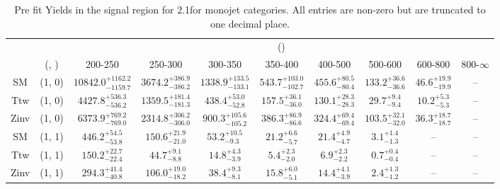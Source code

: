 \begin{table}[h!]
\tiny
\centering
\caption{Pre fit Yields in the signal region for 2.1\ifb for monojet categories. All entries are non-zero but are truncated to one decimal place.\label{tab:prednodatanaive_sig_comb_mono}}
\begin{tabular}
{cccccccccc}
	\hline\hline
	&	& \multicolumn{8}{c}{\scalht (\gev)}\\ 
	&	 (\njet, \nb) & 200-250 & 250-300 & 300-350 & 350-400 & 400-500 & 500-600 & 600-800 & 800-$\infty$ \\ [0.8ex] 
\hline
	SM & (1, 0) & $10842.0^{+ 1162.2 }_{- 1159.7 }$ & $3674.2^{+ 386.9 }_{- 386.2 }$ & $1338.9^{+ 133.5 }_{- 133.1 }$ & $543.7^{+ 103.0 }_{- 102.7 }$ & $455.6^{+ 80.5 }_{- 80.4 }$ & $133.2^{+ 36.6 }_{- 36.6 }$ & $46.6^{+ 19.9 }_{- 19.9 }$ & -- \\[0.5ex] 
	Ttw & (1, 0) & $4427.8^{+ 536.3 }_{- 536.2 }$ & $1359.5^{+ 181.4 }_{- 181.3 }$ & $438.4^{+ 53.0 }_{- 52.8 }$ & $157.5^{+ 36.1 }_{- 36.0 }$ & $130.1^{+ 28.3 }_{- 28.3 }$ & $29.7^{+ 9.4 }_{- 9.4 }$ & $10.2^{+ 5.3 }_{- 5.3 }$ & -- \\[0.5ex] 
	Zinv & (1, 0) & $6373.9^{+ 769.2 }_{- 769.0 }$ & $2314.8^{+ 306.2 }_{- 306.0 }$ & $900.3^{+ 105.6 }_{- 105.2 }$ & $386.3^{+ 86.9 }_{- 86.6 }$ & $324.4^{+ 69.4 }_{- 69.4 }$ & $103.5^{+ 32.1 }_{- 32.0 }$ & $36.3^{+ 18.7 }_{- 18.7 }$ & -- \\[0.5ex] 
	SM & (1, 1) & $446.2^{+ 54.5 }_{- 53.8 }$ & $150.6^{+ 21.9 }_{- 21.0 }$ & $53.2^{+ 10.5 }_{- 9.3 }$ & $21.2^{+ 6.6 }_{- 5.7 }$ & $21.4^{+ 4.9 }_{- 4.7 }$ & $3.1^{+ 1.4 }_{- 1.3 }$ & -- & -- \\[0.5ex] 
	Ttw & (1, 1) & $150.2^{+ 22.7 }_{- 22.4 }$ & $44.7^{+ 9.1 }_{- 8.8 }$ & $14.8^{+ 4.3 }_{- 3.9 }$ & $5.4^{+ 2.3 }_{- 2.0 }$ & $6.9^{+ 2.3 }_{- 2.2 }$ & $0.7^{+ 0.4 }_{- 0.4 }$ & -- & -- \\[0.5ex] 
	Zinv & (1, 1) & $294.3^{+ 41.4 }_{- 40.8 }$ & $106.0^{+ 19.0 }_{- 18.2 }$ & $38.4^{+ 9.3 }_{- 8.1 }$ & $15.8^{+ 6.0 }_{- 5.1 }$ & $14.4^{+ 4.1 }_{- 3.9 }$ & $2.4^{+ 1.3 }_{- 1.2 }$ & -- & -- \\[0.5ex] 
	\hline
	\hline
\end{tabular}
\end{table}
